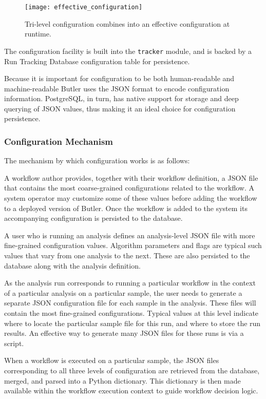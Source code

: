 \begin{figure}[H]
\texttt{[image: effective\_configuration]}
\centering
\caption {Tri-level configuration combines into an effective configuration at runtime.}
\label{fig:effective_configuration}
\end{figure}

The configuration facility is built into the \texttt{tracker} module, and is backed by a Run Tracking Database configuration table for persistence.

Because it is important for configuration to be both human-readable and machine-readable Butler uses the JSON format to encode configuration information. PostgreSQL, in turn, has native support for storage and deep querying of JSON values, thus making it an ideal choice for configuration persistence.

\subsubsection {Configuration Mechanism}

The mechanism by which configuration works is as follows:

A workflow author provides, together with their workflow definition, a JSON file that contains the most coarse-grained configurations related to the workflow. A system operator may customize some of these values before adding the workflow to a deployed version of Butler. Once the workflow is added to the system its accompanying configuration is persisted to the database.

A user who is running an analysis defines an analysis-level JSON file with more fine-grained configuration values. Algorithm parameters and flags are typical such values that vary from one analysis to the next. These are also persisted to the database along with the analysis definition.

As the analysis run corresponds to running a particular workflow in the context of a particular analysis on a particular sample, the user needs to generate a separate JSON configuration file for each sample in the analysis. These files will contain the most fine-grained configurations. Typical values at this level indicate where to locate the particular sample file for this run, and where to store the run results. An effective way to generate many JSON files for these runs is via a script.

When a workflow is executed on a particular sample, the JSON files corresponding to all three levels of configuration are retrieved from the database, merged, and parsed into a Python dictionary. This dictionary is then made available within the workflow execution context to guide workflow decision logic.

